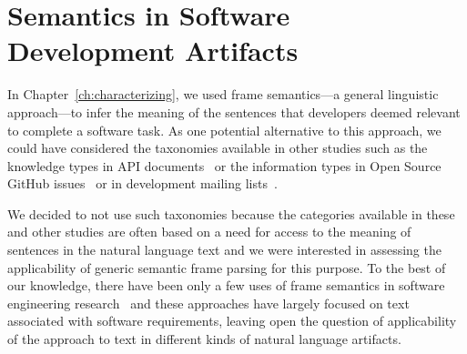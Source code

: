 

\section{Semantics in Software Development Artifacts}
\label{cp7:semantics}



In Chapter~\ref{ch:characterizing}, we used frame semantics---a general
linguistic approach---to infer the meaning of the sentences
that developers deemed relevant to complete a software task.
As one potential alternative to this approach, 
we could have considered the taxonomies available 
in other studies such as the knowledge types in API documents~\cite{Maalej2013}
or the information types in Open Source GitHub issues~\cite{Arya2019} or 
in development mailing lists~\cite{Sorbo2015}.


We decided to not use such taxonomies because the categories available in these and other studies 
are often based
on a need for access to the meaning of
sentences in the natural language text
and we were interested in assessing the
applicability of generic semantic frame
parsing for this purpose.
To the best of our knowledge, there have been only a few uses of frame
semantics in software engineering research~\cite{jha2017, kundi2017, alhoshan2019using}
and these approaches
have largely focused on text associated
with software requirements, leaving open the
question of applicability of the approach to
text in different kinds of natural language artifacts.





